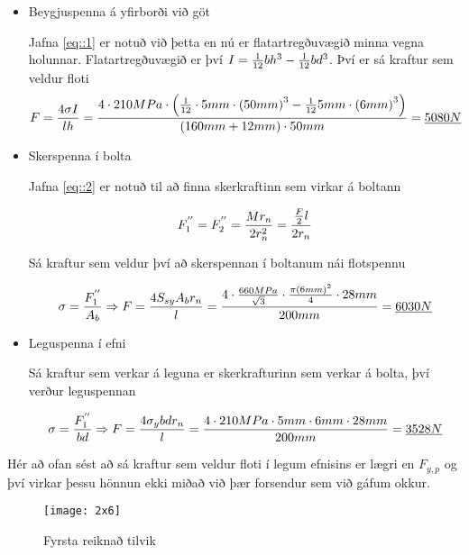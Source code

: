 \begin{itemize}
\item Beygjuspenna á yfirborði við göt
  
  Jafna \ref{eq::1} er notuð við þetta en nú er flatartregðuvægið minna vegna holunnar. 
  Flatartregðuvægið er því $I = {1 \over 12}bh^3 - {1 \over 12}bd^3$. Því er sá kraftur sem veldur floti
  \[
  F = {4 \sigma I \over l h} 
  = {
    4 \cdot 210 MPa \cdot 
    \left(
      {
        1 \over 12
      } 
      \cdot 5 mm \cdot 
      \left(
        50mm
      \right)^3
      - 
      {
        1 \over 12
      } 
      5 mm \cdot 
      \left(
        6mm
      \right)^3
    \right) 
    \over 
    (160 mm + 12 mm) \cdot 50 mm
  } 
  = \underline{5080N}
  \] 

\item Skerspenna í bolta

  Jafna \ref{eq::2} er notuð til að finna skerkraftinn sem virkar á boltann

  \[
  F_1^{''} 
  = F_2^{''} 
  = {Mr_n \over 2r_n^2} 
  = 
  {
    {F \over 2}l \over 2 r_n
  } 
  \]

  Sá kraftur sem veldur því að skerspennan í boltanum nái flotspennu

  \[
  \sigma 
  = {F_1^{''} \over A_b} 
  \Rightarrow 
  F = 
  {
    4 S_{sy} A_b r_n \over l
  } 
  = {
    4 \cdot 
    {
      660MPa \over \sqrt{3}
    } 
    \cdot 
    {
      \pi \left(6mm\right)^2 \over 4
    } 
    \cdot 
    28 mm \over 200 mm
  } 
  = \underline{6030N}
  \]

\item Leguspenna í efni
  
  Sá kraftur sem verkar á leguna er skerkrafturinn sem verkar á bolta, því verður leguspennan
  
  \[
  \sigma 
  = {F_1^{''} \over bd} 
  \Rightarrow 
  F = {4 \sigma_{y} b d r_n \over l} 
  = 
  {
    4 \cdot 210 MPa \cdot 5 mm \cdot 6 mm \cdot 28 mm 
    \over 
    200mm
  } 
  = \underline{3528N}
  \]
\end{itemize}

Hér að ofan sést að sá kraftur sem veldur floti í legum efnisins er lægri en $F_{y,p}$ og því virkar þessu hönnun ekki miðað við þær forsendur sem við gáfum okkur.

\begin{figure}
  \centering
  \texttt{[image: 2x6]}
  \caption{Fyrsta reiknað tilvik}
  \label{fig::2x6}
\end{figure}

